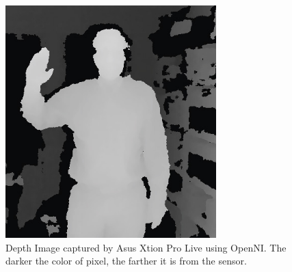 \begin{figure}
	[h] \centering 
	\includegraphics[height=9cm]{figures/content/xtion-depth.jpg} 	
	\caption{Depth Image captured by Asus Xtion Pro Live using OpenNI. The darker the color of pixel, the farther it is from the sensor. \cite{asus-spec} } \label{fg:xtion:depth} 
\end{figure}
